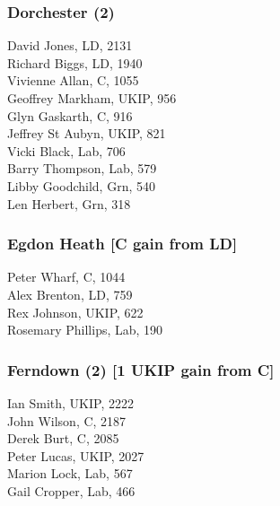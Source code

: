 \documentclass[a4paper,openany,10pt]{book}
\begin{document}
\subsubsection*{Dorchester (2)}



David Jones, LD, 2131\\
Richard Biggs, LD, 1940\\
Vivienne Allan, C, 1055\\
Geoffrey Markham, UKIP, 956\\
Glyn Gaskarth, C, 916\\
Jeffrey St Aubyn, UKIP, 821\\
Vicki Black, Lab, 706\\
Barry Thompson, Lab, 579\\
Libby Goodchild, Grn, 540\\
Len Herbert, Grn, 318\\


\subsubsection*{Egdon Heath \hspace*{\fill}\nolinebreak[1]%
\enspace\hspace*{\fill}
[C gain from LD]}



Peter Wharf, C, 1044\\
Alex Brenton, LD, 759\\
Rex Johnson, UKIP, 622\\
Rosemary Phillips, Lab, 190\\


\subsubsection*{Ferndown (2) \hspace*{\fill}\nolinebreak[1]%
\enspace\hspace*{\fill}
[1 UKIP gain from C]}



Ian Smith, UKIP, 2222\\
John Wilson, C, 2187\\
Derek Burt, C, 2085\\
Peter Lucas, UKIP, 2027\\
Marion Lock, Lab, 567\\
Gail Cropper, Lab, 466\\
\end{document}
